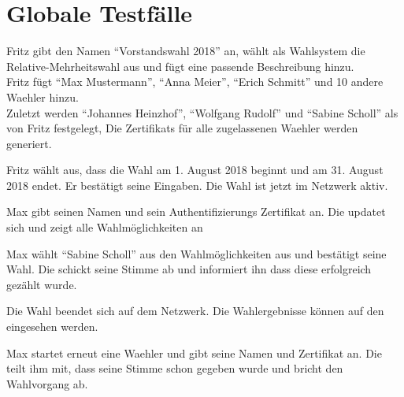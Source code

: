 \documentclass[parskip=full,11pt,twoside]{scrartcl}
\begin{document}
\section{Globale Testfälle}


		{Fritz gibt den Namen \enquote{Vorstandswahl 2018} an, wählt als Wahlsystem die \gls{Relative-Mehrheitswahl} aus und fügt eine passende Beschreibung hinzu.\\
		Fritz fügt \enquote{Max Mustermann}, \enquote{Anna Meier}, \enquote{Erich Schmitt} und 10 andere \gls{Waehler} hinzu.\\
		Zuletzt werden \enquote{Johannes Heinzhof}, \enquote{Wolfgang Rudolf} und \enquote{Sabine Scholl} als  von Fritz festgelegt,}
		{Die \glspl{Zertifikat} für alle zugelassenen \gls{Waehler} werden generiert.}	
	
\teststep{}
		{Fritz wählt aus, dass die \gls{Wahl} am 1. August 2018 beginnt und am 31. August 2018 endet. Er bestätigt seine Eingaben.}
		{Die \gls{Wahl} ist jetzt im \gls{Netzwerk} aktiv.}

		{Max gibt seinen Namen und sein Authentifizierungs \gls{Zertifikat} an.}
		{Die  updatet sich und zeigt alle Wahlmöglichkeiten an}
		
\teststep{}
		{Max wählt \enquote{Sabine Scholl} aus den Wahlmöglichkeiten aus und bestätigt seine Wahl.}
		{Die  schickt seine \gls{Stimme} ab und informiert ihn dass diese erfolgreich gezählt wurde.}
		
		{Die \gls{Wahl} beendet sich auf dem \gls{Netzwerk}.}
		{Die Wahlergebnisse können auf den  eingesehen werden.}
		

		{Max startet erneut eine \gls{Waehler}  und gibt seine Namen und \gls{Zertifikat} an.}
		{Die  teilt ihm mit, dass seine \gls{Stimme} schon gegeben wurde und bricht den Wahlvorgang ab.}
\end{document}
